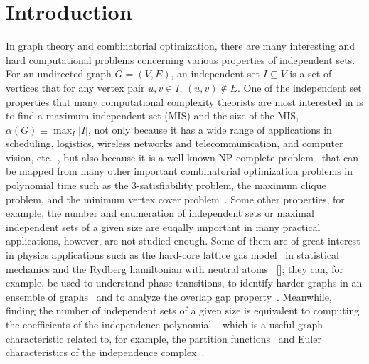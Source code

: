 \documentclass[onefignum, onetabnum]{siamart190516}
\newcommand{\<}{\langle}
\renewcommand{\>}{\rangle}
\newcommand{\red}[1]{[{\bf  \color{red}{ST: #1}}]}
\newcommand{\blue}[1]{[{\bf  \color{blue}{JG: #1}}]}
\newcounter{example}
\begin{document}
\section{Introduction}
In graph theory and combinatorial optimization, there are many interesting and hard computational problems concerning various properties of independent sets.
For an undirected graph $G = (V,E)$, an independent set $I \subseteq V$ is a set of vertices that for any vertex pair $u,v \in I$, $(u, v) \not\in E$. %
One of the independent set properties that many computational complexity theorists are most interested in is to find a maximum independent set (MIS) and the size of the MIS, $\alpha(G) \equiv \max_{I}|I|$,
not only because it has a wide range of applications in scheduling, logistics, wireless networks and telecommunication, and computer vision, etc.~\cite{Butenko2003, Wu2015}, 
but also because it is a well-known NP-complete problem~\cite{Hastad1996} that can be mapped from many other important combinatorial optimization problems in polynomial time such as the 3-satisfiability problem, the maximum clique problem, and the minimum vertex cover problem~\cite{Moore2011}.
Some other properties, for example, the number and enumeration of independent sets or maximal independent sets of a given size are euqally important in many practical applications, however, are not studied enough.
Some of them are of great interest in physics applications such as the hard-core lattice gas model~\cite{Dyre2016, Fernandes2007}
in statistical mechanics and the Rydberg hamiltonian with neutral atoms~\cite{Pichler2018, Ebadi2022} \red{replace with experiment paper when ready};
they can, for example, be used to understand phase transitions, to identify harder graphs in an ensemble of graphs~\cite{Ebadi2022} and to analyze the overlap gap property~\cite{Gamarnik2013, Gamarnik2019}.
Meanwhile, finding the number of independent sets of a given size is equivalent to computing the coefficients of the independence polynomial~\cite{Harvey2018,Ferrin2014}.
which is a useful graph characteristic related to, for example, the partition functions~\cite{Lee1952,Yang1952} and Euler characteristics of the independence complex~\cite{Bousquet2008, Levit2009}.
\end{document}
